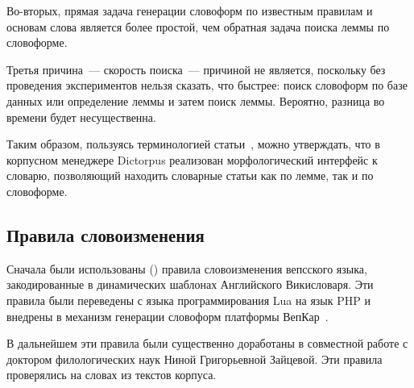 Во-вторых, прямая задача генерации словоформ по известным правилам и основам слова является более простой, чем обратная задача поиска леммы по словоформе.

Третья причина~--- скорость поиска~--- причиной не является, 
поскольку без проведения экспериментов нельзя сказать, что быстрее: 
поиск словоформ по базе данных или определение леммы и затем поиск леммы. 
Вероятно, разница во времени будет несущественна.

Таким образом, пользуясь терминологией статьи~\cite{morphoAPI2dict2004Maxwell}, 
можно утверждать, что в корпусном менеджере Dictorpus 
реализован морфологический интерфейс к словарю, 
позволяющий находить словарные статьи как по лемме, так и по словоформе.


\subsection{Правила словоизменения} \label{sect_flection_rules}

Сначала были использованы () правила словоизменения вепсского языка, 
закодированные в динамических шаблонах Английского Викисловаря. 
Эти правила были переведены с языка программирования Lua 
на язык PHP и внедрены в механизм генерации словоформ 
платформы ВепКар~\cite{KrizhanovskyCorpora2019Wiktionary}.

В дальнейшем эти правила были существенно доработаны 
в совместной работе с доктором филологических наук 
Ниной Григорьевной Зайцевой. 
Эти правила проверялись на словах из текстов корпуса. 
